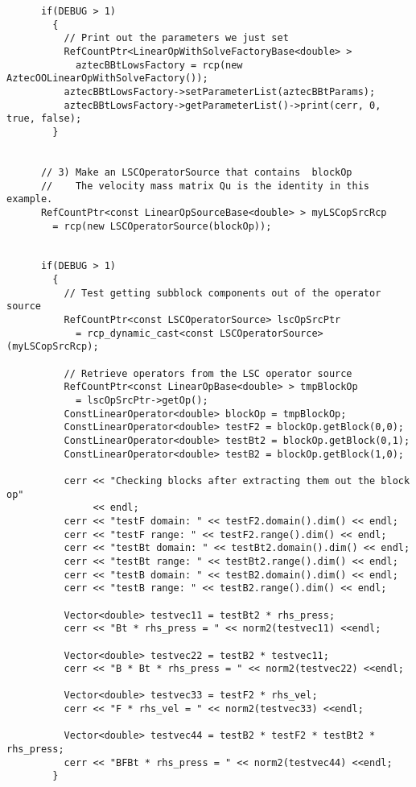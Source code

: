\documentclass[oneeqnum,onefignum,onetabnum,10pt]{SANDreport}
\begin{document}
\begin{verbatim}
      if(DEBUG > 1)
        {
          // Print out the parameters we just set
          RefCountPtr<LinearOpWithSolveFactoryBase<double> > 
            aztecBBtLowsFactory = rcp(new AztecOOLinearOpWithSolveFactory());
          aztecBBtLowsFactory->setParameterList(aztecBBtParams);
          aztecBBtLowsFactory->getParameterList()->print(cerr, 0, true, false);
        }


      // 3) Make an LSCOperatorSource that contains  blockOp
      //    The velocity mass matrix Qu is the identity in this example.
      RefCountPtr<const LinearOpSourceBase<double> > myLSCopSrcRcp 
        = rcp(new LSCOperatorSource(blockOp));


      if(DEBUG > 1) 
        {
          // Test getting subblock components out of the operator source
          RefCountPtr<const LSCOperatorSource> lscOpSrcPtr 
            = rcp_dynamic_cast<const LSCOperatorSource>(myLSCopSrcRcp);  
	  
          // Retrieve operators from the LSC operator source
          RefCountPtr<const LinearOpBase<double> > tmpBlockOp 
            = lscOpSrcPtr->getOp();
          ConstLinearOperator<double> blockOp = tmpBlockOp;
          ConstLinearOperator<double> testF2 = blockOp.getBlock(0,0);
          ConstLinearOperator<double> testBt2 = blockOp.getBlock(0,1);
          ConstLinearOperator<double> testB2 = blockOp.getBlock(1,0);	 
	  
          cerr << "Checking blocks after extracting them out the block op"
               << endl;
          cerr << "testF domain: " << testF2.domain().dim() << endl;
          cerr << "testF range: " << testF2.range().dim() << endl;
          cerr << "testBt domain: " << testBt2.domain().dim() << endl;
          cerr << "testBt range: " << testBt2.range().dim() << endl;
          cerr << "testB domain: " << testB2.domain().dim() << endl;
          cerr << "testB range: " << testB2.range().dim() << endl;

          Vector<double> testvec11 = testBt2 * rhs_press;
          cerr << "Bt * rhs_press = " << norm2(testvec11) <<endl;
	  
          Vector<double> testvec22 = testB2 * testvec11;
          cerr << "B * Bt * rhs_press = " << norm2(testvec22) <<endl;
	  
          Vector<double> testvec33 = testF2 * rhs_vel;
          cerr << "F * rhs_vel = " << norm2(testvec33) <<endl;
	  
          Vector<double> testvec44 = testB2 * testF2 * testBt2 * rhs_press;
          cerr << "BFBt * rhs_press = " << norm2(testvec44) <<endl;
        }



\end{verbatim}
\end{document}
